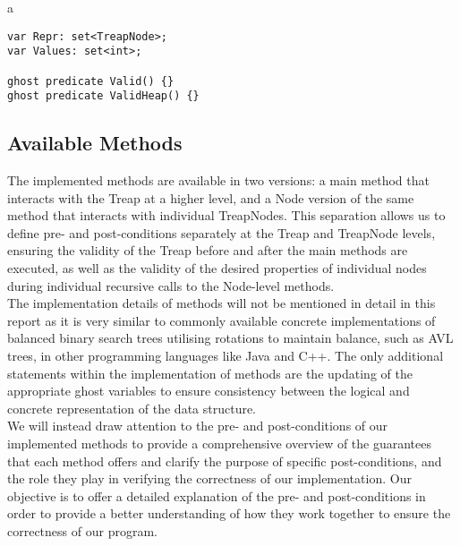 \begin{tabular}{a}
\begin{lstlisting}
var Repr: set<TreapNode>;
var Values: set<int>;

ghost predicate Valid() {}
ghost predicate ValidHeap() {}
\end{lstlisting}
\end{tabular}

\subsection{Available Methods}
The implemented methods are available in two versions: a main method that interacts with the Treap at a higher level, and a Node version of the same method that interacts with individual TreapNodes. This separation allows us to define pre- and post-conditions separately at the Treap and TreapNode levels, ensuring the validity of the Treap before and after the main methods are executed, as well as the validity of the desired properties of individual nodes during individual recursive calls to the Node-level methods.\\

The implementation details of methods will not be mentioned in detail in this report as it is very similar to commonly available concrete implementations of balanced binary search trees utilising rotations to maintain balance, such as AVL trees, in other programming languages like Java and C++. The only additional statements within the implementation of methods are the updating of the appropriate ghost variables to ensure consistency between the logical and concrete representation of the data structure. \\

We will instead draw attention to the pre- and post-conditions of our implemented methods to provide a comprehensive overview of the guarantees that each method offers and clarify the purpose of specific post-conditions, and the role they play in verifying the correctness of our implementation. Our objective is to offer a detailed explanation of the pre- and post-conditions in order to provide a better understanding of how they work together to ensure the correctness of our program.\\


